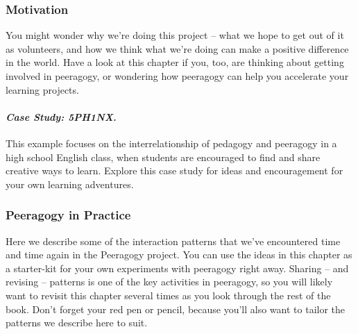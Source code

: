 



\subsubsection{Motivation}
\noindent You might wonder why we're doing this project -- what we
hope to get out of it as volunteers, and how we think what we're doing
can make a positive difference in the world. Have a look at this
chapter if you, too, are thinking about getting involved in peeragogy,
or wondering how peeragogy can help you accelerate your learning
projects.

\paragraph{\emph{Case Study: 5PH1NX.}}
This example focuses on the interrelationship of pedagogy and
peeragogy in a high school English class, when students are
encouraged to find and share creative ways to learn. Explore this
case study for ideas and encouragement for your own learning
adventures.

\subsubsection{Peeragogy in Practice}

\noindent Here we describe some of the interaction patterns that we've
encountered time and time again in the Peeragogy project.  You can use
the ideas in this chapter as a starter-kit for your own experiments
with peeragogy right away.  Sharing -- and revising -- patterns is one
of the key activities in peeragogy, so you will likely want to revisit
this chapter several times as you look through the rest of the book.
Don't forget your red pen or pencil, because you'll also want to
tailor the patterns we describe here to suit.

